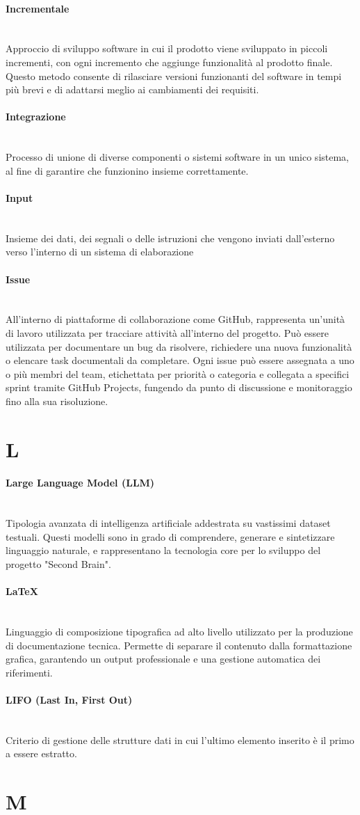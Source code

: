 \documentclass[a4paper, 10pt, colorlinks=true, linkcolor=black, urlcolor=blue, citecolor=blue, hidelinks]{article}
\newcommand{\glossaryterm}[2]{
    \paragraph{#1 \label{term:#1}} \mbox{} \\
    #2
    \vspace{0.5em}
}
\begin{document}
\glossaryterm{Incrementale}{Approccio di sviluppo software in cui il prodotto viene sviluppato in piccoli incrementi, con ogni incremento che aggiunge funzionalità al prodotto finale. Questo metodo consente di rilasciare versioni funzionanti del software in tempi più brevi e di adattarsi meglio ai cambiamenti dei requisiti.}

\glossaryterm{Integrazione}{Processo di unione di diverse componenti o sistemi software in un unico sistema, al fine di garantire che funzionino insieme correttamente.}

\glossaryterm{Input}{Insieme dei dati, dei segnali o delle istruzioni che vengono inviati dall'esterno verso l'interno di un sistema di elaborazione}

\glossaryterm{Issue}{All'interno di piattaforme di collaborazione come GitHub, rappresenta un'unità di lavoro utilizzata per tracciare attività all'interno del progetto. Può essere utilizzata per documentare un bug da risolvere, richiedere una nuova funzionalità o elencare task documentali da completare. Ogni issue può essere assegnata a uno o più membri del team, etichettata per priorità o categoria e collegata a specifici sprint tramite GitHub Projects, fungendo da punto di discussione e monitoraggio fino alla sua risoluzione.}

\newpage

\section*{L}

\glossaryterm{Large Language Model (LLM)}{Tipologia avanzata di intelligenza artificiale addestrata su vastissimi dataset testuali. Questi modelli sono in grado di comprendere, generare e sintetizzare linguaggio naturale, e rappresentano la tecnologia core per lo sviluppo del progetto "Second Brain".}

\glossaryterm{LaTeX}{Linguaggio di composizione tipografica ad alto livello utilizzato per la produzione di documentazione tecnica. Permette di separare il contenuto dalla formattazione grafica, garantendo un output professionale e una gestione automatica dei riferimenti.}

\glossaryterm{LIFO (Last In, First Out)}{Criterio di gestione delle strutture dati in cui l'ultimo elemento inserito è il primo a essere estratto.}

\newpage

\section*{M}
\end{document}
